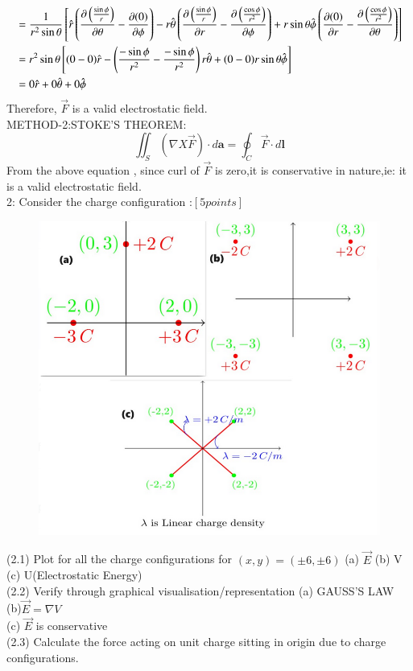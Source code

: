 \documentclass[journal,12pt,onecolumn]{IEEEtran}
\theoremstyle{remark}
\begin{document}
\begin{align}
&=\frac{1}{r^2\sin\theta}{}\left[\hat{r}\left(\frac{\partial\left(\frac{\sin\phi}{r}\right)}{\partial \theta}-\frac{\partial (0)}{\partial \phi}\right)-r \hat{\theta}\left(\frac{\partial\left(\frac{\sin\phi}{r}\right)}{\partial r}-\frac{\partial \left(\frac{\cos\phi}{r^2}\right)}{\partial \phi}\right)+r \sin\theta\hat{\phi}\left(\frac{\partial (0)}{\partial r} -\frac{\partial\left(\frac{\cos\phi}{r^2}\right)}{\partial \theta}\right)\right] \\
&={r^2\sin\theta}{}\left[(0-0)\hat{r}-\left(\frac{-\sin\phi}{r^2}-\frac{-\sin\phi}{r^2}\right)r\hat{\theta}+(0-0)r\sin\theta\hat{\phi}\right]\\
&=0\hat{r}+0\hat{\theta}+0\hat{\phi}
\end{align}
Therefore,  $\overrightarrow{F}$ is a valid electrostatic field.\\
METHOD-2:STOKE'S THEOREM:\\
\[
\iint_S (\nabla X \overrightarrow{F}) \cdot d\mathbf{a} = \oint_C \overrightarrow{F} \cdot d\mathbf{l}
\]
From the above equation , since curl of $\overrightarrow{F}$ is zero,it is conservative in nature,ie: it is a valid electrostatic field.\\


2: Consider the charge configuration :$[5 points]$ \\
\begin{figure}[H]
    \centering
     \includegraphics[scale=0.20]{figs/fig1.png}
    \caption{}    
    \label{fig:ishitha.em.fig1}
\end{figure}
(2.1) Plot for all the charge configurations for $(x,y)=(\pm 6,\pm 6)$ (a) $\overrightarrow{E}$ (b) V (c) U(Electrostatic Energy)\\
(2.2) Verify through graphical visualisation/representation (a) GAUSS'S LAW (b)$\overrightarrow{E}=\nabla{V}$ \\(c) $\overrightarrow{E}$ is conservative \\
(2.3) Calculate the force acting on unit charge sitting in origin due to charge configurations.\\
\end{document}
